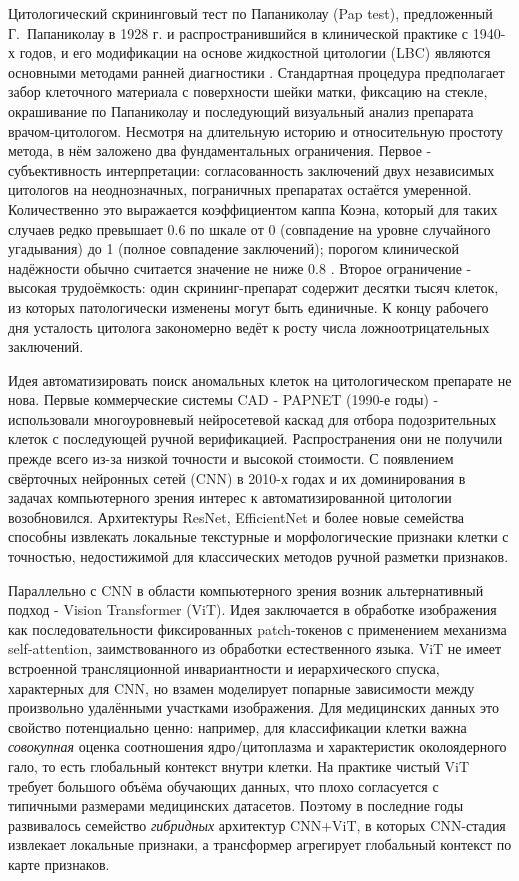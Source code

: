 \documentclass[14pt,a4paper]{extreport}
\begin{document}
Цитологический скрининговый тест по Папаниколау (Pap test), предложенный
Г.~Папаниколау в 1928 г. и распространившийся в клинической практике с
1940-х годов, и его модификации на основе жидкостной цитологии (LBC) являются
основными методами ранней диагностики \cite{hashmi2020comparison}.
Стандартная процедура предполагает забор клеточного материала с поверхности
шейки матки, фиксацию на стекле, окрашивание по Папаниколау и последующий
визуальный анализ препарата врачом-цитологом. Несмотря на длительную историю
и относительную простоту метода, в нём заложено два фундаментальных
ограничения. Первое - субъективность интерпретации: согласованность
заключений двух независимых цитологов на неоднозначных, пограничных
препаратах остаётся умеренной. Количественно это выражается коэффициентом
каппа Коэна, который для таких случаев редко превышает 0.6 по шкале от 0
(совпадение на уровне случайного угадывания) до 1 (полное совпадение
заключений); порогом клинической надёжности обычно считается значение не
ниже 0.8 \cite{branca2015recommendations}. Второе ограничение - высокая
трудоёмкость: один скрининг-препарат содержит десятки тысяч клеток, из
которых патологически изменены могут быть единичные. К концу рабочего дня
усталость цитолога закономерно ведёт к росту числа ложноотрицательных
заключений.

Идея автоматизировать поиск аномальных клеток на цитологическом препарате не
нова. Первые коммерческие системы CAD - PAPNET (1990-е годы) - использовали
многоуровневый нейросетевой каскад для отбора подозрительных клеток с
последующей ручной верификацией. Распространения они не получили
прежде всего из-за низкой точности и высокой стоимости. С появлением
свёрточных нейронных сетей (CNN) в 2010-х годах и их доминирования в задачах
компьютерного зрения \cite{lecun2015deep} интерес к автоматизированной
цитологии возобновился. Архитектуры ResNet, EfficientNet и более новые
семейства способны извлекать локальные текстурные и морфологические
признаки клетки с точностью, недостижимой для классических методов
ручной разметки признаков.

Параллельно с CNN в области компьютерного зрения возник альтернативный
подход - Vision Transformer (ViT). Идея заключается в обработке изображения
как последовательности фиксированных patch-токенов с применением механизма
self-attention, заимствованного из обработки естественного языка. ViT не
имеет встроенной трансляционной инвариантности и иерархического спуска,
характерных для CNN, но взамен моделирует попарные зависимости между
произвольно удалёнными участками изображения. Для медицинских данных это
свойство потенциально ценно: например, для классификации клетки важна
\textit{совокупная} оценка соотношения ядро/цитоплазма и характеристик
околоядерного гало, то есть глобальный контекст внутри клетки. На практике
чистый ViT требует большого объёма обучающих данных, что плохо согласуется
с типичными размерами медицинских датасетов. Поэтому в последние годы
развивалось семейство \textit{гибридных} архитектур CNN+ViT, в
которых CNN-стадия извлекает локальные признаки, а трансформер агрегирует
глобальный контекст по карте признаков.
\end{document}

